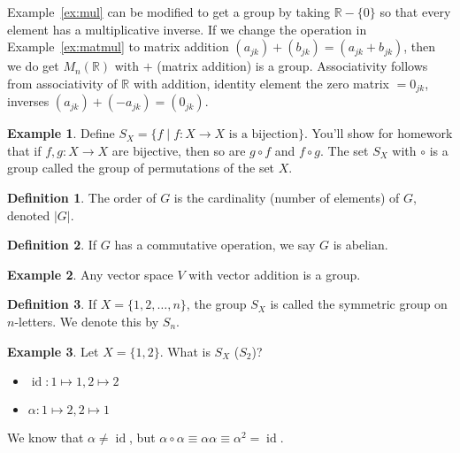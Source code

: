 \documentclass[12pt,letterpaper,DIV=11,final]{scrartcl}
\theoremstyle{plain}
\theoremstyle{definition}
\newtheorem{definition}{Definition}[section]
\newtheorem{example}{Example}[section]
\theoremstyle{remark}
\DeclareMathOperator{\id}{id}
\begin{document}
Example~\ref{ex:mul} can be modified to get a group by taking $\mathbb{R} - \{0\}$ so that every element has a multiplicative inverse.
If we change the operation in Example~\ref{ex:matmul} to matrix addition $(a_{jk}) + (b_{jk}) = (a_{jk} + b_{jk})$, then we do get $M_n(\mathbb{R})$ with $+$ (matrix addition) is a group.
Associativity follows from associativity of $\mathbb{R}$ with addition, identity element the zero matrix $= 0_{jk}$, inverses $(a_{jk}) + (-a_{jk}) = (0_{jk})$.

\begin{example}\label{ex:groupofperms}
  Define $S_X = \{f \mid f: X \to X \text{ is a bijection}\}$.
  You'll show for homework that if $f, g: X \to X$ are bijective, then so are $g \circ f$ and $f \circ g$.
  The set $S_X$ with $\circ$ is a group called the group of permutations of the set $X$.
\end{example}

\begin{definition}\label{def:order}
  The order of $G$ is the cardinality (number of elements) of $G$, denoted $|G|$.
\end{definition}

\begin{definition}
  If $G$ has a commutative operation, we say $G$ is abelian.
\end{definition}

\begin{example}
  Any vector space $V$ with vector addition is a group.
\end{example}

\begin{definition}
  If $X = \{1, 2, \dots, n\}$, the group $S_X$ is called the symmetric group on $n$-letters.
  We denote this by $S_n$.
\end{definition}

\begin{example}\label{ex:s2}
  Let $X = \{1, 2\}$.
  What is $S_X$ ($S_2$)?
  \begin{itemize}
    \item $\id : 1 \mapsto 1, 2 \mapsto 2$
    \item $\alpha : 1 \mapsto 2, 2 \mapsto 1$
  \end{itemize}

  We know that $\alpha \neq \id$, but $\alpha \circ \alpha \equiv \alpha \alpha \equiv \alpha^2 = \id$.
\end{example}
\end{document}

